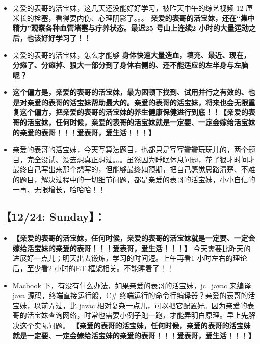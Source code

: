 \documentclass[9pt, b5paper]{article}
\begin{document}
\begin{itemize}
\item 亲爱的表哥的活宝妹，这几天还没能好好学习，被昨天中午的综艺视频 12 厘米长的栓塞，看得要内伤、心理阴影了。。。 \textbf{亲爱的表哥的活宝妹，还在“集中精力”观察各种血管堵塞与疗养状态。最迟25 号山上连续2 小时的大量运动之后，也该好好学习了！！}
\item 亲爱的表哥的活宝妹，怎么才能够 \textbf{身体快速大量造血，填充、最近、现在，分瘫了、分瘫掉、狠大一部分到了身体右侧的、还不能适应的左半身与左脑呢？}
\item \textbf{这个偏方是，亲爱的表哥的活宝妹，最为困顿下找到、试用并行之有效的、也是对亲爱的表哥的活宝妹帮助最大的。亲爱的表哥的活宝妹，将来也会无限重复这个偏方，把亲爱的表哥的活宝妹的养生健康保健进行到底！！【亲爱的表哥的活宝妹，任何时候，亲爱的表哥的活宝妹就是一定要、一定会嫁给活宝妹的亲爱的表哥！！！爱表哥，爱生活！！！】}
\item 亲爱的表哥的活宝妹，今天写算法题目，也都只是写写瓣瓣玩玩儿的，两个题目，完全没试、没去想真正想过。。。虽然因为睡眠休息问题，花了狠才时间才最终自己写出来那个想写的，但能够最终如预期，把自己感觉思路清楚、不难的题目，解决过程中的一切细节问题，都是亲爱的表哥的活宝妹，小小自信的一再、无限增长，哈哈哈！！
\end{itemize}
\subsection{【12/24: Sunday】：}
\label{sec-2-7}
\begin{itemize}
\item \textbf{【亲爱的表哥的活宝妹，任何时候，亲爱的表哥的活宝妹就是一定要、一定会嫁给活宝妹的亲爱的表哥！！！爱表哥，爱生活！！！】} 今天需要比昨天的进展好一点儿；明天出去锻炼，学习的时间短。上午再看1 小时左右的理论后，至少看2 小时的ET 框架相关。不能睡着了！！
\item Macbook 下，有没有什么办法，如果亲爱的表哥的活宝妹，jc=javac 来编译 java 源码，终端直接运行般，C\# 终端运行的命令行编译器？亲爱的表哥的活宝妹，以前弄过，比 javac 相对复杂一点儿，可以把它配置好。因为亲爱的表哥的活宝妹查询网络，时常也需要小例子跑一跑，才能弄明白原理。早上先解决这个实际问题。 \textbf{【亲爱的表哥的活宝妹，任何时候，亲爱的表哥的活宝妹就是一定要、一定会嫁给活宝妹的亲爱的表哥！！！爱表哥，爱生活！！！】}
\end{itemize}
\end{document}
